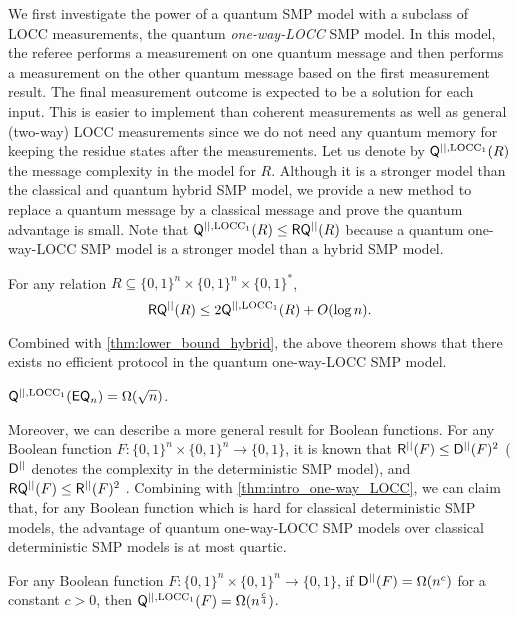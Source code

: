 We first investigate the power of a quantum SMP model with a subclass of LOCC measurements, the quantum {\em one-way-LOCC} SMP model. In this model, the referee performs a measurement on one quantum message and then performs a measurement on the other quantum message based on the first measurement result. The final measurement outcome is expected to be a solution for each input. This is easier to implement than coherent measurements as well as general (two-way) LOCC measurements since we do not need any quantum memory for keeping the residue states after the measurements. Let us denote by $\mathsf{Q}^{||,\mathrm{LOCC}_1}(R)$ the message complexity in the model for $R$. Although it is a stronger model than the classical and quantum hybrid SMP model, we provide a new method to replace a quantum message by a classical message and prove the quantum advantage is small. Note that $\mathsf{Q}^{||,\mathrm{LOCC}_1}(R) \leq \mathsf{R}\mathsf{Q}^{||}(R)$ because a quantum one-way-LOCC SMP model is a stronger model than a hybrid SMP model.

\begin{theorem}\label{thm:intro_one-way_LOCC}
    For any relation $R \subseteq \{0,1\}^n \times \{0,1\}^n \times \{0,1\}^*$,
    \[
        \mathsf{R}\mathsf{Q}^{||}(R) \leq 2 \mathsf{Q}^{||,\mathrm{LOCC}_1}(R) + O(\log n).
    \]
\end{theorem}

Combined with \cref{thm:lower_bound_hybrid}, the above theorem shows that there exists no efficient protocol in the quantum one-way-LOCC SMP model.

\begin{corollary}
    $\mathsf{Q}^{||,\mathrm{LOCC}_1}(\mathsf{EQ}_n) = \Omega(\sqrt{n})$.
\end{corollary}

Moreover, we can describe a more general result for Boolean functions. For any Boolean function $F:\{0,1\}^n \times \{0,1\}^n \rightarrow \{0,1\}$, it is known that $\mathsf{R}^{||}(F) \leq \mathsf{D}^{||}(F)^2$ \cite{BK97} ($\mathsf{D}^{||}$ denotes the complexity in the deterministic SMP model), and $\mathsf{R}\mathsf{Q}^{||}(F) \leq \mathsf{R}^{||}(F)^2$ \cite{GRdW08}. Combining with \cref{thm:intro_one-way_LOCC}, we can claim that, for any Boolean function which is hard for classical deterministic SMP models, the advantage of quantum one-way-LOCC SMP models over classical deterministic SMP models is at most quartic.

\begin{corollary}
    For any Boolean function $F:\{0,1\}^n \times \{0,1\}^n \rightarrow \{0,1\}$, if $\mathsf{D}^{||}(F) = \Omega(n^c)$ for a constant $c > 0$, then $\mathsf{Q}^{||,\mathrm{LOCC_1}} (F) = \Omega(n^{\frac{c}{4}})$.
\end{corollary}

